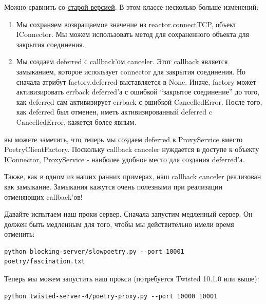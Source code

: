 Можно сравнить со 
\href{http://github.com/jdavisp3/twisted-intro/blob/master/twisted-server-2/poetry-proxy.py#100}{старой версией}. 
В этом классе несколько больше изменений:

\begin{enumerate}

\item Мы сохраняем возвращаемое значение из reactor.connectTCP, 
    объект IConnector. Мы можем использовать метод для сохраненного 
    объекта для закрытия соединения.

\item Мы создаем deferred с callback'ом canceler. Этот 
    callback является замыканием, которое использует 
    connector для закрытия соединения. Но сначала атрибут 
    factory.deferred выставляется в None. Иначе, factory 
    может активизировать errback deferred'а с ошибкой ``закрытое 
    соединение'' до того, как deferred сам активизирует errback  
    с ошибкой CancelledError. После того, как deferred 
    был отменен, иметь активизированный deferred c CancelledError, 
    кажется более явным.

\end{enumerate}


вы можете заметить, что теперь мы создаем deferred в 
ProxyService вместо PoetryClientFactory. Поскольку 
callback canceler нуждается в доступе к объекту IConnector, 
ProxyService - наиболее удобное место для создания 
deferred'а.


Также, как в одном из наших ранних примерах, наш callback 
canceler реализован как замыкание. Замыкания кажутся очень 
полезными при реализации отменяющих callback'ов!


Давайте испытаем наш проки сервер. Сначала запустим медленный сервер. 
Он должен быть медленным для того, чтобы мы действительно имели 
время отменить:

\begin{scriptsize}\begin{verbatim}
python blocking-server/slowpoetry.py --port 10001 poetry/fascination.txt
\end{verbatim}\end{scriptsize}

Теперь мы можем запустить наш прокси (потребуется Twisted 10.1.0 или выше):

\begin{scriptsize}\begin{verbatim}
python twisted-server-4/poetry-proxy.py --port 10000 10001
\end{verbatim}\end{scriptsize}

